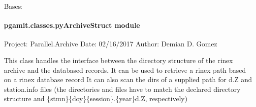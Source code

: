 \documentclass[letterpaper,10pt,english]{sphinxmanual}
\begin{document}

\begin{fulllineitems}
\label{\detokenize{pgamit.classes:pgamit.classes.dbConnection.dbErrUpdate}}
\pysigstartsignatures
\pysigline
{}
\pysigstopsignatures
\sphinxAtStartPar
Bases: 

\end{fulllineitems}


\begin{fulllineitems}
\label{\detokenize{pgamit.classes:pgamit.classes.dbConnection.debug}}
\pysigstartsignatures
\pysiglinewithargsret
{}
{}
{}
\pysigstopsignatures
\end{fulllineitems}



\paragraph{pgamit.classes.pyArchiveStruct module}
\label{\detokenize{pgamit.classes:module-pgamit.classes.pyArchiveStruct}}\label{\detokenize{pgamit.classes:pgamit-classes-pyarchivestruct-module}}
\sphinxAtStartPar
Project: Parallel.Archive
Date: 02/16/2017
Author: Demian D. Gomez

\sphinxAtStartPar
This class handles the interface between the directory structure of the rinex archive and the databased records.
It can be used to retrieve a rinex path based on a rinex database record
It can also scan the dirs of a supplied path for d.Z and station.info files (the directories and files have to match the
declared directory structure and \{stmn\}\{doy\}\{session\}.\{year\}d.Z, respectively)
\end{document}
